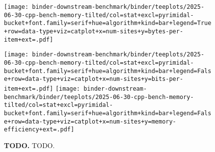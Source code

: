 \begin{figure}

\texttt{[image: binder-downstream-benchmark/binder/teeplots/2025-06-30-cpp-bench-memory-tilted/col=stat+excl=pyrimidal-bucket+font.family=serif+hue=algorithm+kind=bar+legend=True+row=data-type+viz=catplot+x=num-sites+y=bytes-per-item+ext=.pdf]}

\texttt{[image: binder-downstream-benchmark/binder/teeplots/2025-06-30-cpp-bench-memory-tilted/col=stat+excl=pyrimidal-bucket+font.family=serif+hue=algorithm+kind=bar+legend=False+row=data-type+viz=catplot+x=num-sites+y=bits-per-item+ext=.pdf]}%
\texttt{[image: binder-downstream-benchmark/binder/teeplots/2025-06-30-cpp-bench-memory-tilted/col=stat+excl=pyrimidal-bucket+font.family=serif+hue=algorithm+kind=bar+legend=False+row=data-type+viz=catplot+x=num-sites+y=memory-efficiency+ext=.pdf]}

\vspace{-2ex}

\caption{%
\textbf{TODO.}
\small
TODO.
}
\label{fig:memory}
\end{figure}
